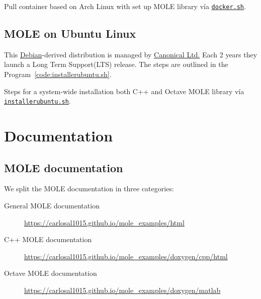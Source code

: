 \begin{listing}[ht!]
	\tiny
	\centering
	\caption{Pull container based on Arch Linux with set up MOLE
		library vía \href{https://raw.githubusercontent.com/carlosal1015/mole_examples/main/tutorial/docker.sh}{\texttt{docker.sh}}.}
	\label{code:docker.sh}
\end{listing}

\section{MOLE on Ubuntu Linux}

This \href{https://www.debian.org}{Debian}-derived distribution is
managed by \href{https://canonical.com}{Canonical Ltd.}
Each 2 years they launch a Long Term Support(LTS) release.
The steps are outlined in the Program~\ref{code:installerubuntu.sh}.

\begin{listing}[ht!]
	\tiny
	\centering
	\caption{Steps for a system-wide installation both C++ and Octave
		MOLE library vía \href{https://raw.githubusercontent.com/carlosal1015/mole_examples/main/tutorial/installerubuntu.sh}{\texttt{installerubuntu.sh}}.}
	\label{code:installerubuntu.sh}
\end{listing}

\chapter{Documentation}

\section{MOLE documentation}

We split the MOLE documentation in three categories:

\begin{description}
	\item[General MOLE documentation]

	      \url{https://carlosal1015.github.io/mole_examples/html}

	\item[C++ MOLE documentation]

	      \url{https://carlosal1015.github.io/mole_examples/doxygen/cpp/html}

	\item[Octave MOLE documentation]

	      \url{https://carlosal1015.github.io/mole_examples/doxygen/matlab}
\end{description}

